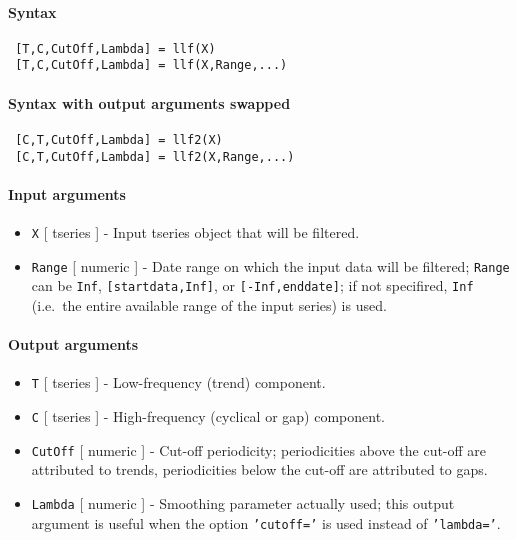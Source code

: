 


	\paragraph{Syntax}
 
 \begin{verbatim}
 [T,C,CutOff,Lambda] = llf(X)
 [T,C,CutOff,Lambda] = llf(X,Range,...)
 \end{verbatim}
 
 \paragraph{Syntax with output arguments swapped}
 
 \begin{verbatim}
 [C,T,CutOff,Lambda] = llf2(X)
 [C,T,CutOff,Lambda] = llf2(X,Range,...)
 \end{verbatim}
 
 \paragraph{Input arguments}
 
 \begin{itemize}
 \item
   \texttt{X} {[} tseries {]} - Input tseries object that will be
   filtered.
 \item
   \texttt{Range} {[} numeric {]} - Date range on which the input data
   will be filtered; \texttt{Range} can be \texttt{Inf},
   \texttt{{[}startdata,Inf{]}}, or \texttt{{[}-Inf,enddate{]}}; if not
   specifired, \texttt{Inf} (i.e.~the entire available range of the input
   series) is used.
 \end{itemize}
 
 \paragraph{Output arguments}
 
 \begin{itemize}
 \item
   \texttt{T} {[} tseries {]} - Low-frequency (trend) component.
 \item
   \texttt{C} {[} tseries {]} - High-frequency (cyclical or gap)
   component.
 \item
   \texttt{CutOff} {[} numeric {]} - Cut-off periodicity; periodicities
   above the cut-off are attributed to trends, periodicities below the
   cut-off are attributed to gaps.
 \item
   \texttt{Lambda} {[} numeric {]} - Smoothing parameter actually used;
   this output argument is useful when the option \texttt{'cutoff='} is
   used instead of \texttt{'lambda='}.
 \end{itemize}
 
